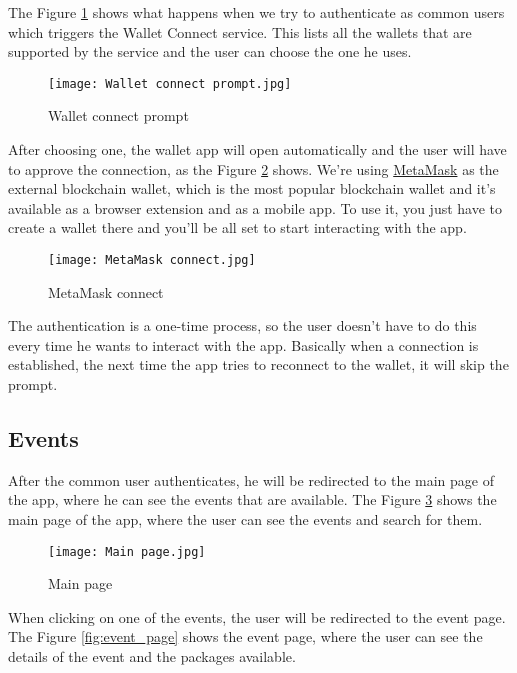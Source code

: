 The Figure \ref{fig:wallet_connect_prompt} shows what happens when we try to
authenticate as common users which triggers the Wallet Connect service. This
lists all the wallets that are supported by the service and the user can choose
the one he uses.

\begin{figure}[H]
	\texttt{[image: Wallet connect prompt.jpg]}
	\centering
	\caption{Wallet connect prompt}
	\label{fig:wallet_connect_prompt}
\end{figure}

After choosing one, the wallet app will open automatically and the user will
have to approve the connection, as the Figure \ref{fig:metamask_connect} shows.
We're using \href{https://metamask.io/}{MetaMask} as the external blockchain
wallet, which is the most popular blockchain wallet and it's available as a
browser extension and as a mobile app. To use it, you just have to create a
wallet there and you'll be all set to start interacting with the app.

\begin{figure}[H]
	\texttt{[image: MetaMask connect.jpg]}
	\centering
	\caption{MetaMask connect}
	\label{fig:metamask_connect}
\end{figure}

The authentication is a one-time process, so the user doesn't have to do this
every time he wants to interact with the app. Basically when a connection is
established, the next time the app tries to reconnect to the wallet, it will
skip the prompt.

\subsection{Events}
\label{subsec:events}

After the common user authenticates, he will be redirected to the main page of
the app, where he can see the events that are available. The Figure
\ref{fig:main_page} shows the main page of the app, where the user can see the
events and search for them.

\begin{figure}[H]
	\texttt{[image: Main page.jpg]}
	\centering
	\caption{Main page}
	\label{fig:main_page}
\end{figure}

When clicking on one of the events, the user will be redirected to the event
page. The Figure \ref{fig:event_page} shows the event page, where the user can
see the details of the event and the packages available.

